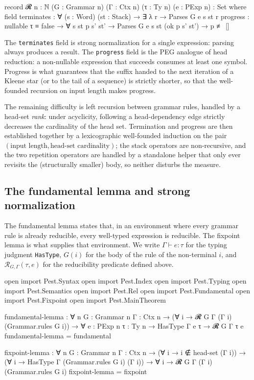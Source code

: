 \documentclass[preprint,12pt]{elsarticle}
\theoremstyle{definition}
\begin{document}
\clearpage

\begin{code}
  record 𝓡 {n : ℕ} (G : Grammar n) (Γ : Ctx n)
                    (τ : Ty n) (e : PExp n) : Set where
    field
      terminates : ∀ (s : Word) (st : Stack)
                 → ∃ λ r → Parses G e s st r
      progress   : nullable τ ≡ false
                 → ∀ s st p s' st'
                 → Parses G e s st (ok p s' st') → p ≢ []
\end{code}

The \lstinline{terminates} field is strong normalization for a single
expression: parsing always produces a result. The \lstinline{progress} field is
the PEG analogue of head reduction: a non-nullable expression that succeeds
consumes at least one symbol. Progress is what guarantees that the suffix handed
to the next iteration of a Kleene star (or to the tail of a sequence) is strictly
shorter, so that the well-founded recursion on input length makes progress.

The remaining difficulty is left recursion between grammar rules, handled by a
head-set \emph{rank}: under acyclicity, following a head-dependency edge strictly
decreases the cardinality of the head set. Termination and progress are then
established together by a lexicographic well-founded induction on the pair
$(\text{input length}, \text{head-set cardinality})$; the stack operators are
non-recursive, and the two repetition operators are handled by a standalone
helper that only ever revisits the (structurally smaller) body, so neither
disturbs the measure.

\subsection{The fundamental lemma and strong normalization}\label{sec:agda-thm}

The fundamental lemma states that, in an environment where every grammar rule is
already reducible, every well-typed expression is reducible. The fixpoint lemma
is what supplies that environment. We write $\Gamma \vdash e : \tau$ for the
typing judgment \lstinline{HasType}, $G(i)$ for the body of the rule of the
non-terminal $i$, and $\mathcal{R}_{G,\Gamma}(\tau, e)$ for the reducibility
predicate defined above.

\begin{code}[hide]
open import Pest.Syntax
open import Pest.Index
open import Pest.Typing
open import Pest.Semantics
open import Pest.Rel
open import Pest.Fundamental
open import Pest.Fixpoint
open import Pest.MainTheorem

fundamental-lemma
  : ∀ {n} {G : Grammar n} {Γ : Ctx n}
  → (∀ i → 𝓡 G Γ (Γ i) (Grammar.rules G i))
  → ∀ {e : PExp n} {τ : Ty n}
  → HasType Γ e τ → 𝓡 G Γ τ e
fundamental-lemma = fundamental

fixpoint-lemma
  : ∀ {n} {G : Grammar n} {Γ : Ctx n}
  → (∀ i → i ∉ head-set (Γ i))
  → (∀ i → HasType Γ (Grammar.rules G i) (Γ i))
  → ∀ i → 𝓡 G Γ (Γ i) (Grammar.rules G i)
fixpoint-lemma = fixpoint
\end{code}
\end{document}
